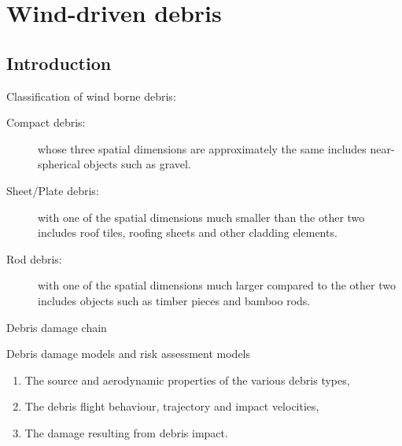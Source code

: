 \chapter{Wind-driven debris}

\section{Introduction}

Classification of wind borne debris:
\begin{description}
\item[Compact debris: ]
whose three spatial dimensions are approximately the same
includes near-spherical objects such as gravel.
\item[Sheet/Plate debris: ]
with one of the spatial dimensions much smaller than the
other two includes roof tiles, roofing sheets and other cladding elements.
\item[Rod debris: ]
with one of the spatial dimensions much larger compared to the
other two includes objects such as timber pieces and bamboo rods.
\end{description}

Debris damage chain

Debris damage models and risk assessment models

\begin{enumerate}
\item The source and aerodynamic properties of the various debris types,
\item The debris flight behaviour, trajectory and impact velocities,
\item The damage resulting from debris impact.
\end{enumerate}

